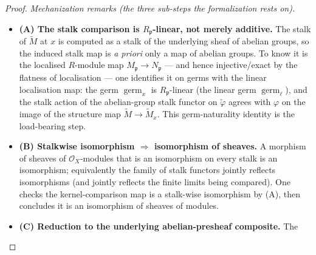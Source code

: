 \begin{proof}
  \emph{Mechanization remarks (the three sub-steps the formalization rests on).}
  \begin{itemize}
    \item \textbf{(A) The stalk comparison is \(R_{\mathfrak{p}}\)-linear, not merely
      additive.} The stalk of \(\widetilde{M}\) at \(x\) is computed as a stalk of the
      underlying sheaf of abelian groups, so the induced stalk map is \emph{a priori}
      only a map of abelian groups. To know it is the localised \(R\)-module map
      \(M_{\mathfrak{p}} \to N_{\mathfrak{p}}\) — and hence injective/exact by the
      flatness of localisation — one identifies it on germs with the linear localisation
      map: the germ \(\operatorname{germ}_x\) is \(R_{\mathfrak{p}}\)-linear (the linear
      germ \(\operatorname{germ}_\ell\)), and the stalk action of the abelian-group stalk
      functor on \(\widetilde{\varphi}\) agrees with \(\varphi\) on the image of the
      structure map \(\widetilde{M} \to \widetilde{M}_x\). This germ-naturality identity
      is the load-bearing step.
    \item \textbf{(B) Stalkwise isomorphism \(\Rightarrow\) isomorphism of sheaves.} A
      morphism of sheaves of \(\mathcal{O}_X\)-modules that is an isomorphism on every
      stalk is an isomorphism; equivalently the family of stalk functors jointly reflects
      isomorphisms (and jointly reflects the finite limits being compared). One checks the
      kernel-comparison map is a stalk-wise isomorphism by (A), then concludes it is an
      isomorphism of sheaves of modules.
    \item \textbf{(C) Reduction to the underlying abelian-presheaf composite.} The

\end{itemize}
\end{proof}

